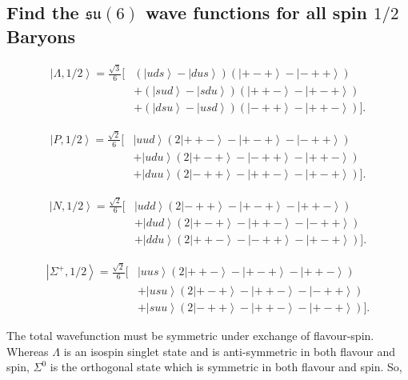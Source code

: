 \documentclass[main.tex]{subfiles}
\begin{document}
\subsection{Find the $\mathfrak{su}(6)$ wave functions for all spin $1/2$ Baryons}
\begin{align}
\left|\Lambda,1/2\right>=\frac{\sqrt{3}}{6}\big[& (\left|uds\right>-\left|dus\right>)(\left|+-+\right>-\left|-++\right>)\nonumber\\
&+(\left|sud\right>-\left|sdu\right>)(\left|++-\right>-\left|+-+\right>)\nonumber\\
&+(\left|dsu\right>-\left|usd\right>)(\left|-++\right>-\left|++-\right>)\big].
\end{align}

\begin{align}
\left|P,1/2\right>=\frac{\sqrt{2}}{6}\big[& \left|uud\right>(2\left|++-\right>-\left|+-+\right>-\left|-++\right>)\nonumber\\
&+\left|udu\right>(2\left|+-+\right>-\left|-++\right>-\left|++-\right>)\nonumber\\
&+\left|duu\right>(2\left|-++\right>-\left|++-\right>-\left|+-+\right>)\big].
\end{align}

\begin{align}
\left|N,1/2\right>=\frac{\sqrt{2}}{6}\big[& \left|udd\right>(2\left|-++\right>-\left|+-+\right>-\left|++-\right>)\nonumber\\
&+\left|dud\right>(2\left|+-+\right>-\left|++-\right>-\left|-++\right>)\nonumber\\
&+\left|ddu\right>(2\left|++-\right>-\left|-++\right>-\left|+-+\right>)\big].
\end{align}

\begin{align}
\left|\Sigma^+,1/2\right>=\frac{\sqrt{2}}{6}\big[& \left|uus\right>(2\left|++-\right>-\left|+-+\right>-\left|++-\right>)\nonumber\\
&+\left|usu\right>(2\left|+-+\right>-\left|++-\right>-\left|-++\right>)\nonumber\\
&+\left|suu\right>(2\left|-++\right>-\left|++-\right>-\left|+-+\right>)\big].
\end{align}

The total wavefunction must be symmetric under exchange of flavour-spin. Whereas $\Lambda$ is an isospin singlet state and is anti-symmetric in both flavour and spin, $\Sigma^0$ is the orthogonal state which is symmetric in both flavour and spin. So, 
\end{document}

